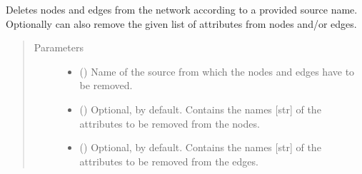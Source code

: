 \documentclass[letterpaper,10pt,english]{sphinxmanual}
\begin{document}
\begin{fulllineitems}
\begin{fulllineitems}
\label{\detokenize{reference:pypath.main.PyPath.delete_by_source}}
Deletes nodes and edges from the network according to a provided
source name. Optionally can also remove the given list of
attributes from nodes and/or edges.
\begin{quote}\begin{description}
\item[{Parameters}] \leavevmode\begin{itemize}
\item {} 
 () \textendash{} Name of the source from which the nodes and edges have to be
removed.

\item {} 
 () \textendash{} Optional,  by default. Contains the names {[}str{]} of
the attributes to be removed from the nodes.

\item {} 
 () \textendash{} Optional,  by default. Contains the names {[}str{]} of
the attributes to be removed from the edges.

\end{itemize}

\end{description}\end{quote}

\end{fulllineitems}



\end{fulllineitems}
\end{document}
